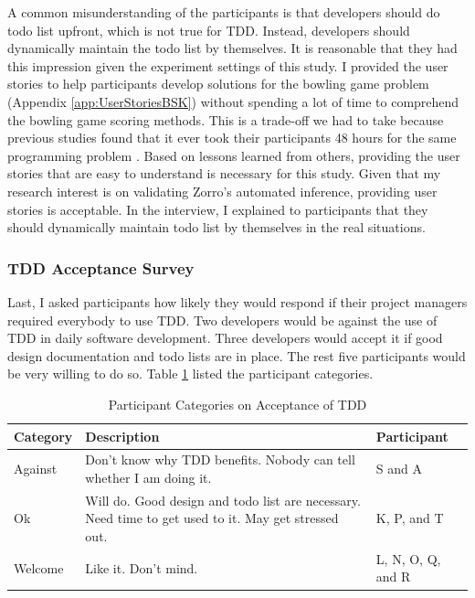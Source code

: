 A common misunderstanding of the participants is that developers
should do todo list upfront, which is not true for TDD. Instead,
developers should dynamically maintain the todo list by themselves. 
It is reasonable that they had this impression given the experiment 
settings of this study. I provided the user stories to help 
participants develop solutions for the bowling game problem 
(Appendix \ref{app:UserStoriesBSK}) without spending a lot of time to 
comprehend the bowling game scoring 
methods. This is a trade-off we had to take because previous studies
found that it ever took their participants 48 hours for the same
programming problem \cite{Erdogmus:05}. Based on lessons learned from
others, providing the user stories that are easy to understand is 
necessary for this study. Given that my research interest is on 
validating Zorro's automated inference, providing user stories is 
acceptable. In the interview, I explained to participants that they 
should dynamically maintain todo list by themselves in 
the real situations.

\subsubsection{TDD Acceptance Survey}
Last, I asked participants how likely they would respond if their 
project managers required everybody to use TDD. Two developers would be 
against the use of TDD in daily software development. Three developers 
would accept it if good design documentation and todo lists are in 
place. The rest five participants would be very willing to do so.
Table \ref{tab:TDDAcceptanceCategory} listed the participant categories.
\begin{table}[!htbp]
\centering
  \begin{tabular}{|l|p{5cm}|l|}
  \hline
    Category & Description & Participant \\ \hline
    Against  & Don't know why TDD benefits. Nobody 
               can tell whether I am doing it. & S and A\\ \hline
    Ok       & Will do. Good design and todo list are necessary. Need 
               time to get used to it. May get stressed out. 
             & K, P, and T \\ \hline 
    Welcome  & Like it. Don't mind. & L, N, O, Q, and R\\ \hline
    \end{tabular}
  \caption{Participant Categories on Acceptance of TDD}
  \label{tab:TDDAcceptanceCategory}  
\end{table}

